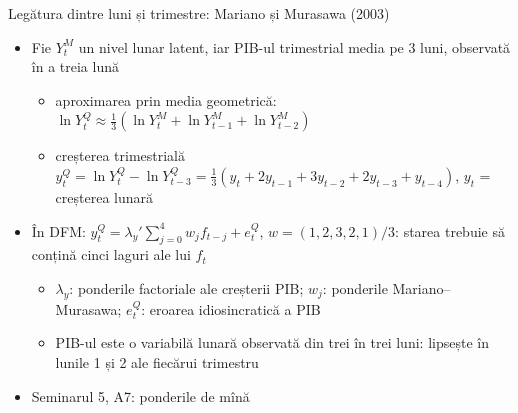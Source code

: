 \begin{frame}{Legătura dintre luni și trimestre: Mariano și Murasawa (2003)}
\itemsize{\small}
\begin{itemize}
    \item Fie $Y_t^M$ un nivel lunar latent, iar PIB-ul trimestrial media pe 3 luni, observată în a treia lună
    \begin{itemize}
        \item aproximarea prin media geometrică: $\ln Y_t^Q \approx \frac13(\ln Y_t^M + \ln Y_{t-1}^M + \ln Y_{t-2}^M)$
        \item creșterea trimestrială $y_t^Q = \ln Y_t^Q - \ln Y_{t-3}^Q = \frac13(y_t + 2y_{t-1} + 3y_{t-2} + 2y_{t-3} + y_{t-4})$, $y_t$ = creșterea lunară 
    \end{itemize}
    \item În DFM: $y_t^Q = \lambda_y'\sum_{j=0}^{4}w_jf_{t-j} + e_t^Q$, $w = (1, 2, 3, 2, 1)/3$: starea trebuie să conțină cinci laguri ale lui $f_t$
    \begin{itemize}
        \item $\lambda_y$: ponderile factoriale ale creșterii PIB; $w_j$: ponderile Mariano--Murasawa; $e_t^Q$: eroarea idiosincratică a PIB
        \item PIB-ul este o variabilă lunară observată din trei în trei luni: lipsește în lunile 1 și 2 ale fiecărui trimestru
    \end{itemize}
    \item Seminarul 5, A7: ponderile de mînă
\end{itemize}
\end{frame}

